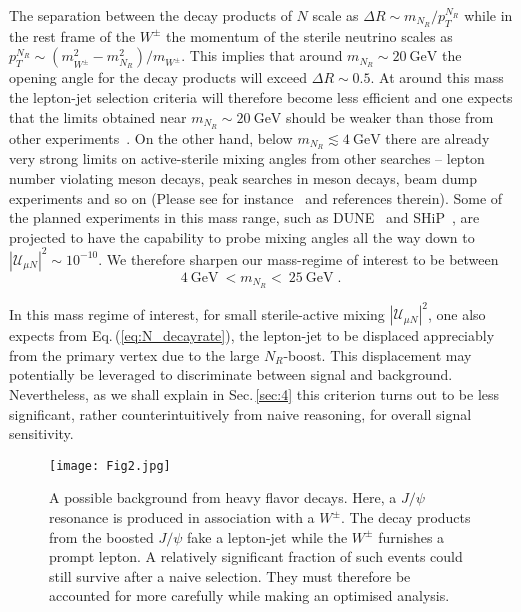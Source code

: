 \documentclass[reprint,doublecolumn,secnumarabic,amssymb, amsmath, aps,nofootinbib,superscriptaddress]{revtex4-1}
\newcommand{\be}{\begin{equation}}
\newcommand{\ee}{\end{equation}}
\newcommand{\Sec}[1]{Sec.\,\ref{#1}}
\newcommand{\mix}{\ensuremath{|\mathcal{U}_{\mu N}|^{2}}}
\newcommand{\gev}{~\text{GeV}}
\begin{document}
The separation between the decay products of $N$ scale as $\Delta R \sim m_{N_R}/p_T^{N_R}$ while in the rest frame of the $W^\pm$ the momentum of the sterile neutrino scales as $p_T^{N_R}\sim(m_{W^\pm}^2-m_{N_R}^2)/m_{W^\pm}$. This implies that around $m_{N_R} \sim 20\gev$ the opening angle for the decay products will exceed $\Delta R \sim 0.5$. At around this mass the lepton-jet selection criteria will therefore become less efficient and one expects that the limits obtained near $m_{N_R} \sim 20\gev$ should be weaker than those from other experiments~\cite{delAguila:2008pw, Akhmedov:2013hec, Basso:2013jka, Blas:2013ana, Antusch:2015mia, Adriani:1992pq, Abreu:1996pa}. On the other hand, below $m_{N_R} \lesssim 4\gev$ there are already very strong limits on active-sterile mixing angles from other searches -- lepton number violating meson decays, peak searches in meson decays, beam dump experiments and so on (Please see for instance~\cite{Deppisch:2015qwa} and references therein). Some of the planned experiments in this mass range, such as DUNE~\cite{Acciarri:2016crz,Acciarri:2015uup} and SHiP~\cite{Alekhin:2015byh, DeLellis:2017rfg}, are projected to have the capability to probe mixing angles all the way down to $\mix \sim 10^{-10}$. We therefore sharpen our mass-regime of interest to be between
\be
4\gev ~<m_{N_R}<~25\gev\; .
\ee

In this mass regime of interest, for small sterile-active mixing $|\mathcal{U}_{\mu N}|^2$, one also expects from Eq.\,(\ref{eq:N_decayrate}), the lepton-jet to be displaced appreciably from the primary vertex due to the large $N_R$-boost. This displacement may potentially be leveraged to discriminate between signal and background. Nevertheless, as we shall explain in \Sec{sec:4} this criterion turns out to be less significant, rather counterintuitively from naive reasoning, for overall signal sensitivity.

\begin{figure}
  \centering
   \texttt{[image: Fig2.jpg]}
  \caption{A possible background from heavy flavor decays. Here, a $J/\psi$ resonance is produced in association with a $W^\pm$. The decay products from the boosted $J/\psi$ fake a lepton-jet while the $W^\pm$ furnishes a prompt lepton. A relatively significant fraction of such events could still survive after a naive selection. They must therefore be accounted for more carefully while making an optimised analysis.}
  \label{fig:wcc_event}
\end{figure}
\end{document}
